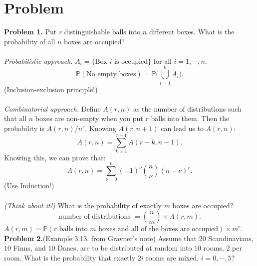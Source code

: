 \section{Problem}
\textbf{Problem 1.} Put $r$ distinguishable balls into $n$ different boxes. What is the probability of all $n$ boxes are occupied?\\ \\
\textit{Probabilistic approach.} $A_i=\{\text{Box $i$ is occupied}\}$ for all $i=1,\cdots, n$.
\begin{equation}
\mathbb{P}(\text{No empty boxes}) = \mathbb{P}\Big(\bigcup_{i=1}^n A_i\Big).
\end{equation}
(Inclusion-exclusion principle!)\\ \\
\textit{Combinatorial approach.} Define $A(r,n)$ as the number of distributions such that all $n$ boxes are non-empty when you put $r$ balls into them. Then the probability is $A(r,n)/n^r$. Knowing $A(r,n+1)$ can lead us to $A(r,n)$:
\begin{equation}
A(r,n) = \sum_{k=1}^{r-1}A(r-k,n-1).
\end{equation}
Knowing this, we can prove that:
\begin{equation}
A(r,n) = \sum_{\nu = 0}^n(-1)^\nu\binom{n}{\nu}(n-\nu)^r.
\end{equation}
(Use Induction!)\\ \\
\textit{(Think about it!)} What is the probability of exactly $m$ boxes are occupied?
\begin{equation}
\text{number of distributions }= \binom{n}{m}\times A(r,m).
\end{equation}
$A(r,m) = \mathbb{P}(\text{$r$ balls into $m$ boxes and all of the boxes are occupied})\times m^r$.
\newpage
\textbf{Problem 2.}(Example 3.13. from Gravner's note) Assume that $20$ Scandinavians, $10$ Finns, and $10$ Danes, are to be distributed
at random into $10$ rooms, $2$ per room. What is the probability that exactly $2i$ rooms are mixed, $i = 0,\cdots,5$?

